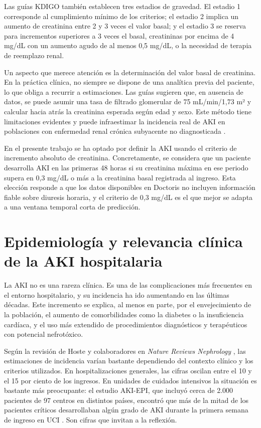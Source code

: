 \documentclass[12pt, a4paper, oneside]{report}
\begin{document}
Las guías KDIGO también establecen tres estadios de gravedad. El estadio 1 corresponde al cumplimiento mínimo de los criterios; el estadio 2 implica un aumento de creatinina entre 2 y 3 veces el valor basal; y el estadio 3 se reserva para incrementos superiores a 3 veces el basal, creatininas por encima de 4 mg/dL con un aumento agudo de al menos 0,5 mg/dL, o la necesidad de terapia de reemplazo renal.

Un aspecto que merece atención es la determinación del valor basal de creatinina. En la práctica clínica, no siempre se dispone de una analítica previa del paciente, lo que obliga a recurrir a estimaciones. Las guías sugieren que, en ausencia de datos, se puede asumir una tasa de filtrado glomerular de 75 mL/min/1,73 m² y calcular hacia atrás la creatinina esperada según edad y sexo. Este método tiene limitaciones evidentes y puede infraestimar la incidencia real de AKI en poblaciones con enfermedad renal crónica subyacente no diagnosticada \parencite{palevsky2013kdoqi}.

En el presente trabajo se ha optado por definir la AKI usando el criterio de incremento absoluto de creatinina. Concretamente, se considera que un paciente desarrolla AKI en las primeras 48 horas si su creatinina máxima en ese periodo supera en 0,3 mg/dL o más a la creatinina basal registrada al ingreso. Esta elección responde a que los datos disponibles en Doctoris no incluyen información fiable sobre diuresis horaria, y el criterio de 0,3 mg/dL es el que mejor se adapta a una ventana temporal corta de predicción.

\section{Epidemiología y relevancia clínica de la AKI hospitalaria}

La AKI no es una rareza clínica. Es una de las complicaciones más frecuentes en el entorno hospitalario, y su incidencia ha ido aumentando en las últimas décadas. Este incremento se explica, al menos en parte, por el envejecimiento de la población, el aumento de comorbilidades como la diabetes o la insuficiencia cardíaca, y el uso más extendido de procedimientos diagnósticos y terapéuticos con potencial nefrotóxico.

Según la revisión de Hoste y colaboradores en \textit{Nature Reviews Nephrology} \parencite{hoste2018epidemiology}, las estimaciones de incidencia varían bastante dependiendo del contexto clínico y los criterios utilizados. En hospitalizaciones generales, las cifras oscilan entre el 10 y el 15 por ciento de los ingresos. En unidades de cuidados intensivos la situación es bastante más preocupante: el estudio AKI-EPI, que incluyó cerca de 2.000 pacientes de 97 centros en distintos países, encontró que más de la mitad de los pacientes críticos desarrollaban algún grado de AKI durante la primera semana de ingreso en UCI \parencite{hoste2015akiepi}. Son cifras que invitan a la reflexión.
\end{document}
